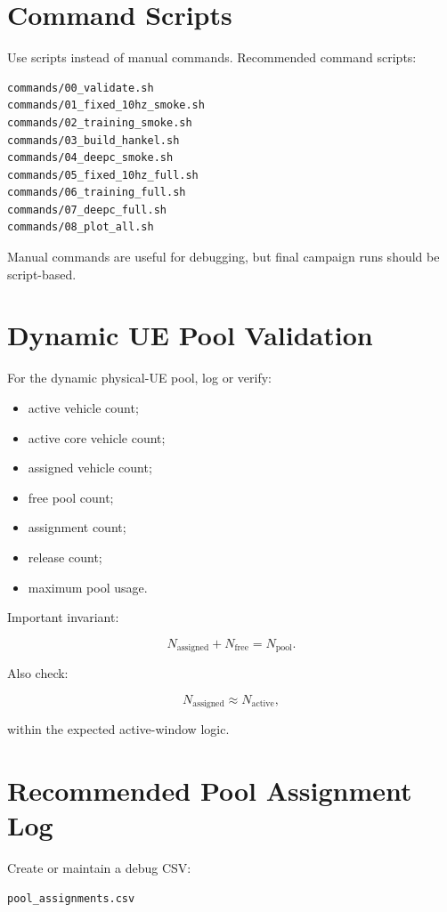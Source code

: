 \documentclass[11pt]{article}
\begin{document}
\section{Command Scripts}

Use scripts instead of manual commands. Recommended command scripts:

\begin{lstlisting}
commands/00_validate.sh
commands/01_fixed_10hz_smoke.sh
commands/02_training_smoke.sh
commands/03_build_hankel.sh
commands/04_deepc_smoke.sh
commands/05_fixed_10hz_full.sh
commands/06_training_full.sh
commands/07_deepc_full.sh
commands/08_plot_all.sh
\end{lstlisting}

Manual commands are useful for debugging, but final campaign runs should be script-based.

\section{Dynamic UE Pool Validation}

For the dynamic physical-UE pool, log or verify:

\begin{itemize}
    \item active vehicle count;
    \item active core vehicle count;
    \item assigned vehicle count;
    \item free pool count;
    \item assignment count;
    \item release count;
    \item maximum pool usage.
\end{itemize}

Important invariant:

\[
N_{\mathrm{assigned}} + N_{\mathrm{free}} = N_{\mathrm{pool}}.
\]

Also check:

\[
N_{\mathrm{assigned}} \approx N_{\mathrm{active}},
\]

within the expected active-window logic.

\section{Recommended Pool Assignment Log}

Create or maintain a debug CSV:

\begin{lstlisting}
pool_assignments.csv
\end{lstlisting}
\end{document}
